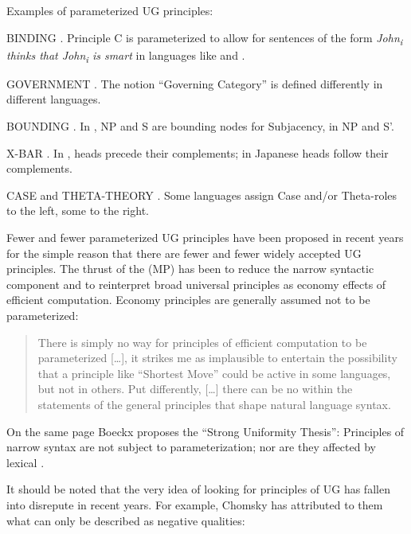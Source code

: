 \documentclass[output=paper,
modfonts
]{LSP/langsci}
\begin{document}
\begin{exe}
\ex Examples of parameterized UG principles:
\begin{xlist}
\ex  BINDING \citep{lasnik1991}. Principle C is parameterized to allow for
sentences of the form \emph{John\textsubscript{i} thinks that
John\textsubscript{i} is smart} in languages like  and .

\ex GOVERNMENT \citep{manzini1987}. The notion ``Governing Category''
is defined differently in different languages.

\ex BOUNDING \citep{rizzi1982}. In , NP and S are bounding nodes for
Subjacency, in  NP and S'.

\ex X-BAR \citep{stowell1981}. In , heads precede their complements; in
Japanese heads follow their complements.

\ex CASE and THETA-THEORY \citep{travis1989}. Some languages assign Case
and/or Theta-roles to the left, some to the right.
\end{xlist}
\end{exe}

Fewer and fewer parameterized UG principles have been proposed in recent
years for the simple reason that there are fewer and fewer widely
accepted UG principles. The thrust of the  (MP) has
been to reduce the narrow syntactic component and to reinterpret broad
universal principles as economy effects of efficient computation.
Economy principles are generally assumed not to be parameterized:

\begin{quote}
There is simply no way for principles of efficient computation to be
parameterized {[}\ldots{]}, it strikes me as implausible to entertain
the possibility that a principle like ``Shortest Move'' could be active in
some languages, but not in others. Put differently, {[}\ldots{]} there
can be no  within the statements of the general principles
that shape natural language syntax. \citep[210]{boeckx2011}
\end{quote}

On the same page Boeckx proposes the ``Strong Uniformity Thesis'':
Principles of narrow syntax are not subject to parameterization; nor are
they affected by lexical .

It should be noted that the very idea of looking for principles of UG
has fallen into disrepute in recent years. For example, Chomsky has
attributed to them what can only be described as negative qualities:
\end{document}
